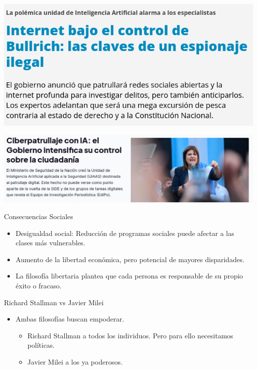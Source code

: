 \documentclass{beamer}
\begin{document}
\begin{frame}
  \includegraphics[width=\linewidth]{images/control1.png}
\end{frame}

\begin{frame}
  \includegraphics[width=\linewidth]{images/control2.png}
\end{frame}

\begin{frame}{Consecuencias Sociales}
    \begin{itemize}
        \item Desigualdad social: Reducción de programas sociales puede afectar a las clases más vulnerables. \pause
        \item Aumento de la libertad económica, pero potencial de mayores disparidades. \pause
        \item La filosofía libertaria plantea que cada persona es responsable de su propio éxito o fracaso.
    \end{itemize}
\end{frame}

\begin{frame}{Richard Stallman vs Javier Milei}
    \begin{itemize}
    \item Ambas filosofías buscan empoderar. \pause
      \begin{itemize}
        \item Richard Stallman a todos los individuos. Pero para ello necesitamos políticas.\pause
        \item Javier Milei a los ya poderosos.
      \end{itemize}
    \end{itemize}
\end{frame}
\end{document}
